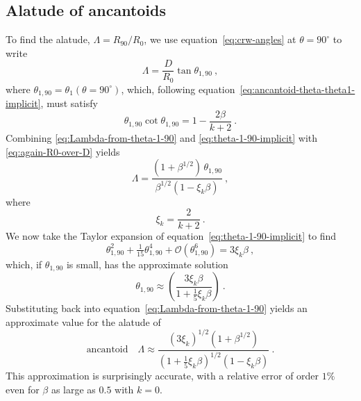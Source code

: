\subsection{Alatude of ancantoids}
\label{sec:ancantoid-alatude}

To find the alatude, \(\Lambda = R_{90} / R_0\), we use equation~\eqref{eq:crw-angles} at \(\theta = 90^\circ\) to write
\begin{equation}
  \label{eq:Lambda-from-theta-1-90}
  \Lambda = \frac{D} {R_0} \tan \theta_{1,90} \ , 
\end{equation}
where \(\theta_{1,90} = \theta_1(\theta = 90^\circ)\), which, following
equation~\eqref{eq:ancantoid-theta-theta1-implicit}, must satisfy
\begin{equation}
  \label{eq:theta-1-90-implicit}
  \theta_{1,90} \cot \theta_{1,90}  = 1 - \frac{2 \beta}{k + 2} \ . 
\end{equation}
Combining \eqref{eq:Lambda-from-theta-1-90} and
\eqref{eq:theta-1-90-implicit} with \eqref{eq:again-R0-over-D} yields
\begin{equation}
  \label{eq:Lambda-beta-xi-theta-1-90}
  \Lambda = \frac{ \left(1 + \beta^{1/2}\right) \,\theta_{1,90}} {\beta^{1/2} \left(1 - \xi_k \beta\right)} \ ,
\end{equation}
where
\begin{equation}
  \label{eq:xi-k}
  \xi_k = \frac{2} {k +2} \ .
\end{equation}
We now take the Taylor expansion of equation~\eqref{eq:theta-1-90-implicit} to find
\begin{equation}
  \label{eq:theta-1-90-Taylor}
  \theta_{1,90}^2 + \tfrac{1}{15}  \theta_{1,90}^4 + \mathcal{O}(\theta_{1,90}^6)
  = 3 \xi_k \beta \ , 
\end{equation}
which, if \(\theta_{1,90}\) is small, has the approximate solution
\begin{equation}
  \label{eq:theta-1-90-approx}
  \theta_{1,90} \approx \left( \frac{3 \xi_k \beta} {1 + \tfrac15 \xi_k \beta} \right) \ .
\end{equation}
Substituting back into equation~\eqref{eq:Lambda-from-theta-1-90}
yields an approximate value for the alatude of
\begin{equation}
  \label{eq:Lambda-approx}
  \text{ancantoid} \quad
  \Lambda \approx \frac {(3 \xi_k)^{1/2} \left( 1 + \beta^{1/2} \right)}
  { \left( 1 + \tfrac15 \xi_k \beta \right)^{1/2} \left( 1 - \xi_k \beta \right)} \ .
\end{equation}
This approximation is surprisingly accurate, with a relative error of
order \(1\%\) even for \(\beta\) as large as \(0.5\) with \(k = 0\).  

